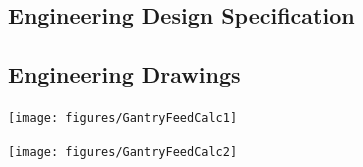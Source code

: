 \documentclass[11pt]{article}
\begin{document}
\begin{appendices}
\newpage
\vspace*{\fill}
\begin{center}
\section{Engineering Design Specification}
\label{engineeringDesignSpecifications}
\end{center}
\vspace*{\fill}





\newpage
\vspace*{\fill}
\begin{center}
\section{Engineering Drawings}
\end{center}
\vspace*{\fill}



















\texttt{[image: figures/GantryFeedCalc1]}

\texttt{[image: figures/GantryFeedCalc2]}

\pagebreak

\vspace*{\fill}
\begin{center}

\end{center}
\end{appendices}
\end{document}
